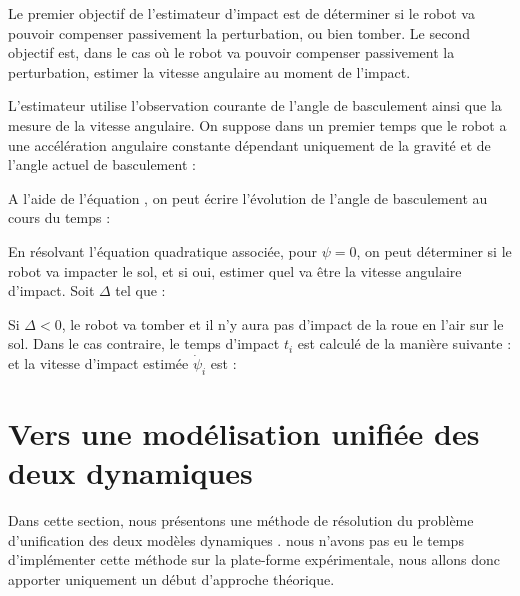 			Le premier objectif de l'estimateur d'impact est de déterminer si le robot va pouvoir compenser passivement la perturbation, ou bien tomber.
			Le second objectif est, dans le cas où le robot va pouvoir compenser passivement la perturbation, estimer la vitesse angulaire au moment de l'impact.
			
			L'estimateur utilise l'observation courante de l'angle de basculement ainsi que la mesure de la vitesse angulaire.
			On suppose dans un premier temps que le robot a une accélération angulaire constante dépendant uniquement de la gravité et de l'angle actuel de basculement :
			
			A l'aide de l'équation , on peut écrire l'évolution de l'angle de basculement au cours du temps :
			
			En résolvant l'équation quadratique associée, pour $\psi=0$, on peut déterminer si le robot va impacter le sol, et si oui, estimer quel va être la vitesse angulaire d'impact.
			Soit $\Delta$ tel que :
			
			Si $\Delta<0$, le robot va tomber et il n'y aura pas d'impact de la roue en l'air sur le sol.
			Dans le cas contraire, le temps d'impact $t_i$ est calculé de la manière suivante :
			et la vitesse d'impact estimée $\dot{\psi}_i$ est :

	\section{Vers une modélisation unifiée des deux dynamiques}
	\label{section.modelisation_unifiee}
	
		Dans cette section, nous présentons une méthode de résolution du problème d'unification des deux modèles dynamiques .
		nous n'avons pas eu le temps d'implémenter cette méthode sur la plate-forme expérimentale, nous allons donc apporter uniquement un début d'approche théorique.
		
